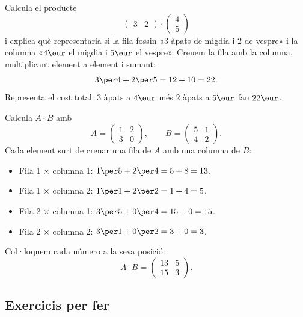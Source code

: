 \begin{exresolt}
Calcula el producte
\[
\begin{pmatrix} 3 & 2 \end{pmatrix}\cdot\begin{pmatrix} 4 \\ 5 \end{pmatrix}
\]
i explica què representaria si la fila fossin «$3$ àpats de migdia i $2$ de vespre»
i la columna «$4\eur$ el migdia i $5\eur$ el vespre».
\solucio
Creuem la fila amb la columna, multiplicant element a element i sumant:
\[
3\per 4 + 2\per 5 = 12 + 10 = 22.
\]
Representa el cost total: $3$ àpats a $4\eur$ més $2$ àpats a $5\eur$ fan $22\eur$.
\end{exresolt}

\begin{exresolt}
Calcula $A\cdot B$ amb
\[
A=\begin{pmatrix} 1 & 2 \\ 3 & 0 \end{pmatrix},\qquad
B=\begin{pmatrix} 5 & 1 \\ 4 & 2 \end{pmatrix}.
\]
\solucio
Cada element surt de creuar una fila de $A$ amb una columna de $B$:
\begin{itemize}[leftmargin=1.4em, itemsep=2pt]
  \item Fila 1 $\times$ columna 1: $1\per 5 + 2\per 4 = 5 + 8 = 13$.
  \item Fila 1 $\times$ columna 2: $1\per 1 + 2\per 2 = 1 + 4 = 5$.
  \item Fila 2 $\times$ columna 1: $3\per 5 + 0\per 4 = 15 + 0 = 15$.
  \item Fila 2 $\times$ columna 2: $3\per 1 + 0\per 2 = 3 + 0 = 3$.
\end{itemize}
Col·loquem cada número a la seva posició:
\[
A\cdot B=\begin{pmatrix} 13 & 5 \\ 15 & 3 \end{pmatrix}.
\]
\end{exresolt}

\subsection{Exercicis per fer}

